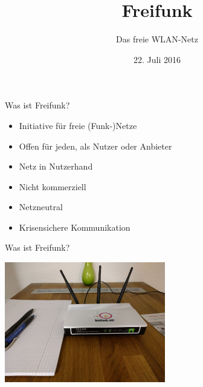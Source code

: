 \documentclass[t]{beamer}
\title{Freifunk}
\author{Das freie WLAN-Netz} %
\date{22. Juli 2016}
\begin{document}
  \maketitle

  \begin{frame}{Was ist Freifunk?}
    \begin{itemize}
      \item Initiative für freie (Funk-)Netze
      \item Offen für jeden, als Nutzer oder Anbieter
      \item Netz in Nutzerhand
      \item Nicht kommerziell
      \item Netzneutral
      \item Krisensichere Kommunikation
    \end{itemize}
  \end{frame}

  \begin{frame}{Was ist Freifunk?}
    \begin{center}
      \includegraphics[width=7cm]{images/homerouter}
    \end{center}
  \end{frame}
\end{document}
